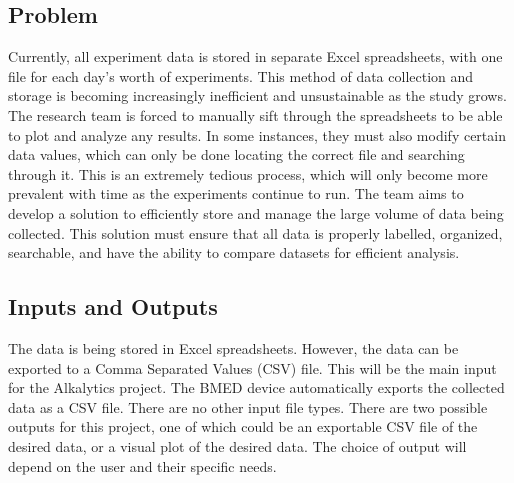\documentclass{article}
\begin{document}
\subsection{Problem}
Currently, all experiment data is stored in separate Excel spreadsheets, with
one file for each day's worth of experiments. This method of data collection and
storage is becoming increasingly inefficient and unsustainable as the study
grows. The research team is forced to manually sift through the spreadsheets to
be able to plot and analyze any results. In some instances, they must also
modify certain data values, which can only be done locating the correct file and
searching through it. This is an extremely tedious process, which will only
become more prevalent with time as the experiments continue to run. The team
aims to develop a solution to efficiently store and manage the large volume of
data being collected. This solution must ensure that all data is properly
labelled, organized, searchable, and have the ability to compare datasets for
efficient analysis.

\subsection{Inputs and Outputs}
The data is being stored in Excel spreadsheets. However, the data can be
exported to a Comma Separated Values (CSV) file. This will be the main input for
the Alkalytics project. The BMED device automatically exports the collected data
as a CSV file. There are no other input file types.
\newline
\newline
There are two possible outputs for this project, one of which could be an
exportable CSV file of the desired data, or a visual plot of the desired data.
The choice of output will depend on the user and their specific needs.
\end{document}
